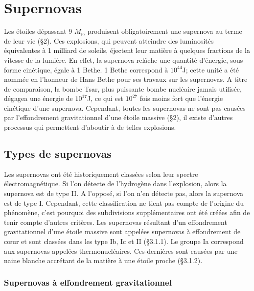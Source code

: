 

\chapter{Supernovas}

Les étoiles dépassant 9 $M_\odot$ produisent obligatoirement une supernova au terme de leur vie (§2). Ces explosions, qui peuvent atteindre des luminosités équivalentes à 1 milliard de soleils, éjectent leur matière à quelques fractions de la vitesse de la lumière. En effet, la supernova relâche une quantité d'énergie, sous forme cinétique, égale à 1 Bethe. 1 Bethe correspond à $10^{44}$J; cette unité a été nommée en l'honneur de Hans Bethe pour ses travaux sur les supernovas. A titre de comparaison, la bombe Tsar, plus puissante bombe nucléaire jamais utilisée, dégagea une énergie de $10^{17}$J, ce qui est $10^{27}$ fois moins fort que l'énergie cinétique d'une supernova. %
Cependant, toutes les supernovas ne sont pas causées par l'effondrement gravitationnel d'une étoile massive (§2), il existe d'autres processus qui permettent d'aboutir à de telles explosions.\bigskip

\section{Types de supernovas} \medskip

Les supernovas ont été historiquement classées selon leur spectre électromagnétique. Si l'on détecte de l'hydrogène dans l'explosion, alors la supernova est de type II. A l'opposé, si l'on n'en détecte pas, alors la supernova est de type I. Cependant, cette classification ne tient pas compte de l'origine du phénomène, c'est pourquoi des subdivisions supplémentaires ont été créées afin de tenir compte d'autres critères. Les supernovas résultant d'un effondrement gravitationnel d'une étoile massive sont appelées supernovas à effondrement de cœur et sont classées dans les type Ib, Ic et II (§3.1.1). Le groupe Ia correspond aux supernovas appelées thermonucléaires. Ces-dernières sont causées par une naine blanche accrétant de la matière à une étoile proche (§3.1.2).\bigskip

\subsection{Supernovas à effondrement gravitationnel }\medskip

